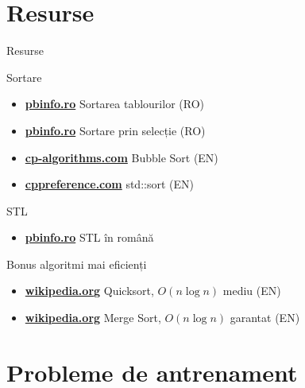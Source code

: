 ﻿\documentclass{beamer}
\begin{document}
\section{Resurse}

\begin{frame}{Resurse}
  \begin{block}{Sortare}
    \begin{itemize}
      \item \href{https://www.pbinfo.ro/articole/5587/sortarea-tablourilor}{\textbf{pbinfo.ro}} \textemdash{} Sortarea tablourilor (RO)
      \item \href{https://www.pbinfo.ro/articole/5563/sortarea-prin-selectie}{\textbf{pbinfo.ro}} \textemdash{} Sortare prin selecție (RO)
      \item \href{https://cp-algorithms.com/sequences/bubble-sort.html}{\textbf{cp-algorithms.com}} \textemdash{} Bubble Sort (EN)
      \item \href{https://en.cppreference.com/w/cpp/algorithm/sort}{\textbf{cppreference.com}} \textemdash{} std::sort (EN)
    \end{itemize}
  \end{block}
  \begin{block}{STL}
    \begin{itemize}
      \item \href{https://www.pbinfo.ro/articole/23702/standard-template-library-stl}{\textbf{pbinfo.ro}} \textemdash{} STL în română
    \end{itemize}
  \end{block}
  \begin{block}{Bonus \textemdash{} algoritmi mai eficienți}
    \begin{itemize}
      \item \href{https://en.wikipedia.org/wiki/Quicksort}{\textbf{wikipedia.org}} \textemdash{} Quicksort, $O(n \log n)$ mediu (EN)
      \item \href{https://en.wikipedia.org/wiki/Merge_sort}{\textbf{wikipedia.org}} \textemdash{} Merge Sort, $O(n \log n)$ garantat (EN)
    \end{itemize}
  \end{block}
\end{frame}

\section{Probleme de antrenament}
\end{document}
